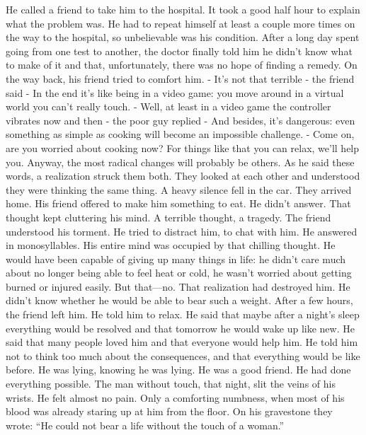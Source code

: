 {He called a friend to take him to the hospital. It took a good half hour to explain what the problem was. He had to repeat himself at least a couple more times on the way to the hospital, so unbelievable was his condition. After a long day spent going from one test to another, the doctor finally told him he didn’t know what to make of it and that, unfortunately, there was no hope of finding a remedy.
On the way back, his friend tried to comfort him.
- It’s not that terrible - the friend said - In the end it’s like being in a video game: you move around in a virtual world you can’t really touch.
- Well, at least in a video game the controller vibrates now and then - the poor guy replied - And besides, it’s dangerous: even something as simple as cooking will become an impossible challenge.
- Come on, are you worried about cooking now? For things like that you can relax, we’ll help you. Anyway, the most radical changes will probably be others.
As he said these words, a realization struck them both. They looked at each other and understood they were thinking the same thing. A heavy silence fell in the car.
They arrived home. His friend offered to make him something to eat. He didn’t answer. That thought kept cluttering his mind. A terrible thought, a tragedy.
The friend understood his torment. He tried to distract him, to chat with him. He answered in monosyllables. His entire mind was occupied by that chilling thought. He would have been capable of giving up many things in life: he didn’t care much about no longer being able to feel heat or cold, he wasn’t worried about getting burned or injured easily. But that—no. That realization had destroyed him. He didn’t know whether he would be able to bear such a weight.
After a few hours, the friend left him. He told him to relax. He said that maybe after a night’s sleep everything would be resolved and that tomorrow he would wake up like new. He said that many people loved him and that everyone would help him. He told him not to think too much about the consequences, and that everything would be like before. He was lying, knowing he was lying. He was a good friend. He had done everything possible.
The man without touch, that night, slit the veins of his wrists. He felt almost no pain. Only a comforting numbness, when most of his blood was already staring up at him from the floor.
On his gravestone they wrote: “He could not bear a life without the touch of a woman.”}

